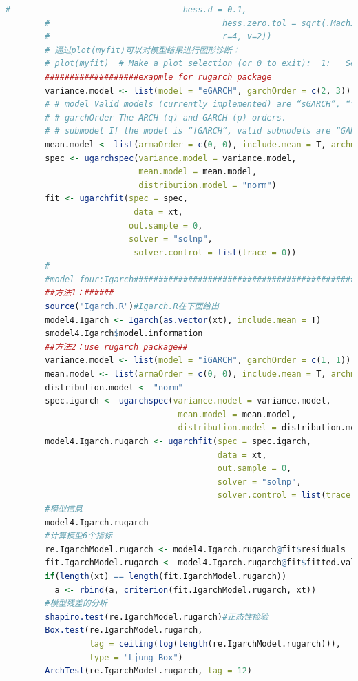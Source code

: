 \begin{lstlisting}[language = R]
        #                                   hess.d = 0.1,
        #                                   hess.zero.tol = sqrt(.Machine$double.eps/7e-7),
        #                                   r=4, v=2))
        # 通过plot(myfit)可以对模型结果进行图形诊断：
        # plot(myfit)  # Make a plot selection (or 0 to exit):  1:   Series with 2 Conditional SD
        ###################exapmle for rugarch package
        variance.model <- list(model = "eGARCH", garchOrder = c(2, 3))
        # # model Valid models (currently implemented) are “sGARCH”, “fGARCH”, “eGARCH”, “gjrGARCH”, “apARCH” and “iGARCH” and “csGARCH”.
        # # garchOrder The ARCH (q) and GARCH (p) orders.
        # # submodel If the model is “fGARCH”, valid submodels are “GARCH”, “TGARCH”, “AVGARCH”, “NGARCH”, “NAGARCH”, “APARCH”,“GJRGARCH” and “ALLGARCH”.
        mean.model <- list(armaOrder = c(0, 0), include.mean = T, archm = F)
        spec <- ugarchspec(variance.model = variance.model,
                           mean.model = mean.model,
                           distribution.model = "norm")
        fit <- ugarchfit(spec = spec,
                          data = xt,
                         out.sample = 0,
                         solver = "solnp",
                          solver.control = list(trace = 0))
        #
        #model four:Igarch#######################################################
        ##方法1：######
        source("Igarch.R")#Igarch.R在下面给出
        model4.Igarch <- Igarch(as.vector(xt), include.mean = T)
        smodel4.Igarch$model.information
        ##方法2：use rugarch package##
        variance.model <- list(model = "iGARCH", garchOrder = c(1, 1))
        mean.model <- list(armaOrder = c(0, 0), include.mean = T, archm = F)
        distribution.model <- "norm"
        spec.igarch <- ugarchspec(variance.model = variance.model,
                                   mean.model = mean.model,
                                   distribution.model = distribution.model)
        model4.Igarch.rugarch <- ugarchfit(spec = spec.igarch,
                                           data = xt,
                                           out.sample = 0,
                                           solver = "solnp",
                                           solver.control = list(trace = 0))
        #模型信息
        model4.Igarch.rugarch
        #计算模型6个指标
        re.IgarchModel.rugarch <- model4.Igarch.rugarch@fit$residuals  #residuals(model4.Igarch.rugarch)
        fit.IgarchModel.rugarch <- model4.Igarch.rugarch@fit$fitted.values  #fitted(model4.Igarch.rugarch)
        if(length(xt) == length(fit.IgarchModel.rugarch))
          a <- rbind(a, criterion(fit.IgarchModel.rugarch, xt))
        #模型残差的分析
        shapiro.test(re.IgarchModel.rugarch)#正态性检验
        Box.test(re.IgarchModel.rugarch,
                 lag = ceiling(log(length(re.IgarchModel.rugarch))),
                 type = "Ljung-Box")
        ArchTest(re.IgarchModel.rugarch, lag = 12)
        \end{lstlisting}

